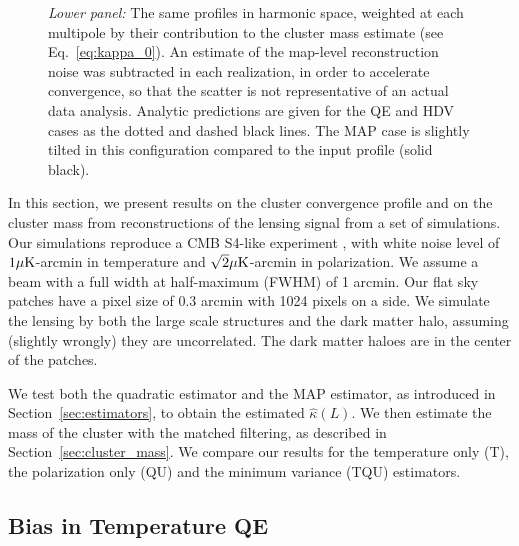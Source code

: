 \documentclass[prd, superscriptaddress, tightenlines, longbibliography, nofootinbib, eqsecnum, amsfonts, amsmath, floatfix, twocolumn, notitlepage]{revtex4-2}
\begin{document}
\begin{figure}
{		\emph{Lower panel:} The same profiles in harmonic space, weighted at each multipole by their contribution to the cluster mass estimate (see Eq.~\eqref{eq:kappa_0}). An estimate of the map-level reconstruction noise was subtracted in each realization, in order to accelerate convergence, so that the scatter is not representative of an actual data analysis. Analytic predictions are given for the QE and HDV cases as the dotted and dashed black lines. The MAP case is slightly tilted in this configuration compared to the input profile (solid black).}
	\label{fig:Bias_sup}
\end{figure}
In this section, we present results on the cluster convergence profile and on the cluster mass from reconstructions of the lensing signal from a set of simulations. 
Our simulations reproduce a CMB S4-like experiment \cite{CMB-S4:2016ple}, with white noise level of  $1 \mu \rm{K}$-arcmin in temperature and $\sqrt{2} \mu \rm{K}$-arcmin in polarization. We assume a beam with a full width at half-maximum (FWHM) of 1 arcmin.
Our flat sky patches have a pixel size of $0.3$ arcmin with 1024 pixels on a side. We simulate the lensing by both the large scale structures and the dark matter halo, assuming (slightly wrongly) they are uncorrelated. The dark matter haloes are in the center of the patches. 


We test both the quadratic estimator and the MAP estimator, as introduced in Section~\ref{sec:estimators}, to obtain the estimated $\hat{\kappa}(L)$.
We then estimate the mass of the cluster with the matched filtering, as described in Section~\ref{sec:cluster_mass}. We compare our results for the temperature only (T), the polarization only (QU) and the minimum variance (TQU) estimators.


\subsection{Bias in Temperature QE}
\end{document}
